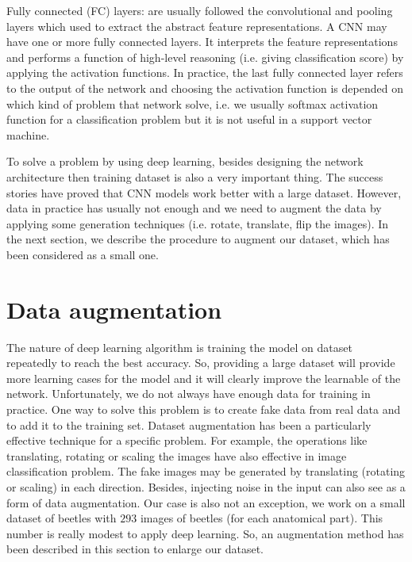 \documentclass[review]{elsarticle}
\begin{document}
Fully connected (FC) layers: are usually followed the convolutional and pooling layers which used to extract the abstract feature representations. A CNN may have one or more fully connected layers. It interprets the feature representations and performs a function of high-level reasoning (i.e. giving classification score) by applying the activation functions. In practice, the last fully connected layer refers to the output of the network and choosing the activation function is depended on which kind of problem that network solve, i.e. we usually softmax activation function for a classification problem but it is not useful in a support vector machine. 

To solve a problem by using deep learning, besides designing the network architecture then training dataset is also a very important thing. The success stories \cite{krizhevsky2012imagenet,he2016deep} have proved that CNN models work better with a large dataset. However, data in practice has usually not enough and we need to augment the data by applying some generation techniques (i.e. rotate, translate, flip the images). In the next section, we describe the procedure to augment our dataset, which has been considered as a small one.

\section{Data augmentation}
\label{Sdataaug}

The nature of deep learning algorithm is training the model on dataset repeatedly to reach the best accuracy. So, providing a large dataset will provide more learning cases for the model and it will clearly improve the learnable of the network. Unfortunately, we do not always have enough data for training in practice. One way to solve this problem is to create fake data from real data and to add it to the training set. Dataset augmentation has been a particularly effective technique for a specific problem. For example, the operations like translating, rotating or scaling the images have also effective in image classification problem. The fake images may be generated by translating (rotating or scaling) in each direction. Besides, injecting noise in the input can also see as a form of data augmentation. Our case is also not an exception, we work on a small dataset of beetles with $293$ images of beetles (for each anatomical part). This number is really modest to apply deep learning. So, an augmentation method has been described in this section to enlarge our dataset.
\end{document}
